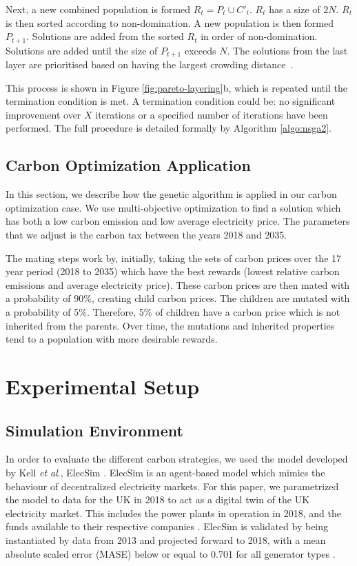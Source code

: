 Next, a new combined population is formed $R_{t}=P_{t} \cup C'_{t}$. $R_t$ has a size of $2N$. $R_t$ is then sorted according to non-domination. A new population is then formed $P_{t+1}$. Solutions are added from the sorted $R_t$ in order of non-domination. Solutions are added until the size of $P_{t+1}$ exceeds $N$. The solutions from the last layer are prioritised based on having the largest crowding distance~\cite{Valkanas2014}.

This process is shown in Figure \ref{fig:pareto-layering}b, which is repeated until the termination condition is met. A termination condition could be:  no significant improvement over $X$ iterations or a specified number of iterations have been performed. The full procedure is detailed formally by Algorithm \ref{algo:nsga2}.


\subsection{Carbon Optimization Application}

In this section, we describe how the genetic algorithm is applied in our carbon optimization case. We use multi-objective optimization to find a solution which has both a low carbon emission and low average electricity price. The parameters that we adjust is the carbon tax between the years 2018 and 2035.

The mating steps work by, initially, taking the sets of carbon prices over the 17 year period (2018 to 2035) which have the best rewards (lowest relative carbon emissions and average electricity price). These carbon prices are then mated with a probability of 90\%, creating child carbon prices. The children are mutated with a probability of 5\%. Therefore, 5\% of children have a carbon price which is not inherited from the parents. Over time, the mutations and inherited properties tend to a population with more desirable rewards.


\section{Experimental Setup}
\label{sec:sim_environment}


\subsection{Simulation Environment}
In order to evaluate the different carbon strategies, we used the model developed by Kell \textit{et al}., ElecSim \cite{Kell,Kell2020}. ElecSim is an agent-based model which mimics the behaviour of decentralized electricity markets. For this paper, we parametrized the model to data for the UK in 2018 to act as a digital twin of the UK electricity market. This includes the power plants in operation in 2018, and the funds available to their respective companies \cite{dukes_511, companies_house}. ElecSim is validated by being instantiated by data from 2013 and projected forward to 2018, with a mean absolute scaled error (MASE) below or equal to 0.701 for all generator types \cite{Kell2020}. 

